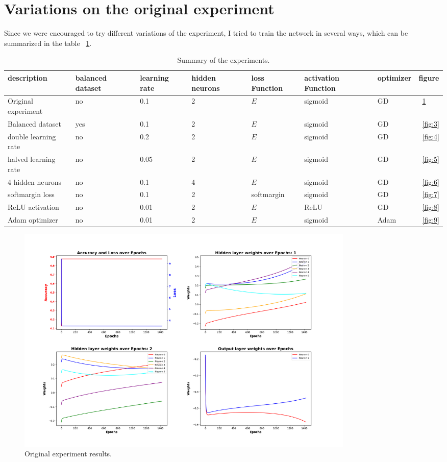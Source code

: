 \documentclass{article}
\begin{document}
    \section{Variations on the original experiment}\label{sec:variations}

    Since we were encouraged to try different variations of the experiment, I tried to train the network in several ways, which can be summarized in the table ~\ref{tab:1}.
    \newpage
    \begin{table}
        \footnotesize
        \centering
        \begin{tabular}{ p{2.6cm} p{1.5cm} p{1.5cm} p{1.5cm} p{1.5cm} p{1.5cm} p{1.5cm} p{1.5cm} }
            \hline
            \textbf{description} & \textbf{balanced dataset} & \textbf{learning rate} & \textbf{hidden neurons} & \textbf{loss Function} & \textbf{activation Function} & \textbf{optimizer} & \textbf{figure}\\
            \hline
            Original experiment & no & 0.1 & 2 & $E$ & sigmoid & GD & ~\ref{fig:2}\\
            Balanced dataset & yes & 0.1 & 2 & $E$ & sigmoid & GD & ~\ref{fig:3}\\
            double learning rate & no & 0.2 & 2 & $E$ & sigmoid & GD & ~\ref{fig:4}\\
            halved learning rate & no & 0.05 & 2 & $E$ & sigmoid & GD & ~\ref{fig:5}\\
            4 hidden neurons & no & 0.1 & 4 & $E$ & sigmoid & GD & ~\ref{fig:6}\\
            softmargin loss & no & 0.1 & 2 & softmargin & sigmoid & GD & ~\ref{fig:7}\\
            ReLU activation & no & 0.01 & 2 & $E$ & ReLU & GD & ~\ref{fig:8}\\
            Adam optimizer & no & 0.01 & 2 & $E$ & sigmoid & Adam & ~\ref{fig:9}\\
            \hline
        \end{tabular}
        \caption{Summary of the experiments.}
        \label{tab:1}
    \end{table}

    \begin{figure}
        \centering
        \includegraphics[width=0.8\textwidth]{images/plt-00}
        \caption{Original experiment results.}
        \label{fig:2}
    \end{figure}
\end{document}
